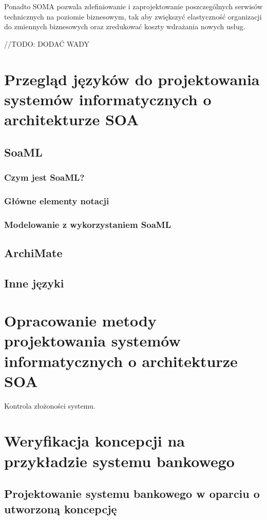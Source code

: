 Ponadto SOMA pozwala zdefiniowanie i zaprojektowanie poszczególnych serwisów technicznych na poziomie biznesowym, tak aby zwiększyć elastyczność organizacji do zmiennych biznesowych oraz zredukować koszty wdrażania nowych usług.

//TODO: DODAĆ WADY

\chapter{Przegląd języków do projektowania systemów informatycznych o architekturze SOA}
\section{SoaML}

\subsection{Czym jest SoaML?}


\subsection{Główne elementy notacji}
\subsection{Modelowanie z wykorzystaniem SoaML}
\section{ArchiMate}
\section{Inne języki}

\chapter{Opracowanie metody projektowania systemów informatycznych o architekturze SOA}
Kontrola złożoności systemu.

\chapter{Weryfikacja koncepcji na przykładzie systemu bankowego}
\section{Projektowanie systemu bankowego w oparciu o utworzoną koncepcję}
